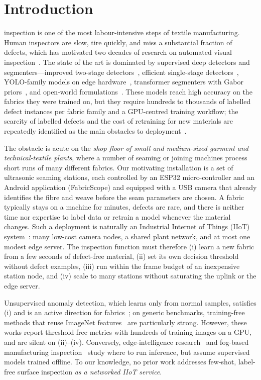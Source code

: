\section{Introduction}
 inspection is one of the most labour-intensive steps of textile manufacturing. Human inspectors are slow, tire quickly, and miss a substantial fraction of defects, which has motivated two decades of research on automated visual inspection~\cite{kumar2008survey,carrilho2024survey}. The state of the art is dominated by supervised deep detectors and segmenters---improved two-stage detectors~\cite{wu2020cascaded}, efficient single-stage detectors~\cite{zhou2021edds,zhang2022mobilenet}, YOLO-family models on edge hardware~\cite{machado2025textile,nasim2024realworld}, transformer segmenters with Gabor priors~\cite{xu2023swin}, and open-world formulations~\cite{ye2026owdln}. These models reach high accuracy on the fabrics they were trained on, but they require hundreds to thousands of labelled defect instances per fabric family and a GPU-centred training workflow; the scarcity of labelled defects and the cost of retraining for new materials are repeatedly identified as the main obstacles to deployment~\cite{carrilho2024survey}.

The obstacle is acute on the \emph{shop floor of small and medium-sized garment and technical-textile plants}, where a number of seaming or joining machines process short runs of many different fabrics. Our motivating installation is a set of ultrasonic seaming stations, each controlled by an ESP32 micro-controller and an Android application (FabricScope) and equipped with a USB camera that already identifies the fibre and weave before the seam parameters are chosen. A fabric typically stays on a machine for minutes, defects are rare, and there is neither time nor expertise to label data or retrain a model whenever the material changes. Such a deployment is naturally an Industrial Internet of Things (IIoT) system~\cite{sisinni2018iiot}: many low-cost camera nodes, a shared plant network, and at most one modest edge server. The inspection function must therefore (i) learn a new fabric from a few seconds of defect-free material, (ii) set its own decision threshold without defect examples, (iii) run within the frame budget of an inexpensive station node, and (iv) scale to many stations without saturating the uplink or the edge server.

Unsupervised anomaly detection, which learns only from normal samples, satisfies (i) and is an active direction for fabrics~\cite{zhang2026dmglad,ma2025pnemfd,an2025causality}; on generic benchmarks, training-free methods that reuse ImageNet features~\cite{rippel2021gaussian,defard2021padim,roth2022patchcore} are particularly strong. However, these works report threshold-free metrics with hundreds of training images on a GPU, and are silent on (ii)--(iv). Conversely, edge-intelligence research~\cite{shi2016edge,zhou2019edgeintel,li2020edgeai} and fog-based manufacturing inspection~\cite{li2018fog} study where to run inference, but assume supervised models trained offline. To our knowledge, no prior work addresses few-shot, label-free surface inspection \emph{as a networked IIoT service}.

